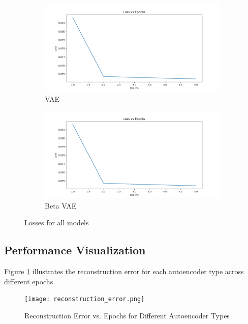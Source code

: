 \begin{figure}
  \begin{subfigure}[t]{.5\textwidth}
    \centering
    \includegraphics[width=\linewidth]{figures/loss.png}
    \caption{VAE}
  \end{subfigure}
  \hfill
  \begin{subfigure}[t]{.5\textwidth}
    \centering
    \includegraphics[width=\linewidth]{figures/loss.png}
    \caption{Beta VAE}
  \end{subfigure}
    \caption{Losses for all models}
\end{figure}

\subsection{Performance Visualization}

Figure \ref{fig:reconstruction_error} illustrates the reconstruction error for each autoencoder type across different epochs.

\begin{figure}[htbp]
    \centering
    \texttt{[image: reconstruction\_error.png]}
    \caption{Reconstruction Error vs. Epochs for Different Autoencoder Types}
    \label{fig:reconstruction_error}
\end{figure}

